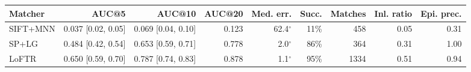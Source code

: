 \begin{tabular}{lrrrrrrrr}
\toprule
Matcher & AUC@5 & AUC@10 & AUC@20 & Med. err. & Succ. & Matches & Inl. ratio & Epi. prec. \\
\midrule
SIFT+MNN & 0.037 [0.02, 0.05] & 0.069 [0.04, 0.10] & 0.123 & 62.4$^\circ$ & 11\% & 458 & 0.05 & 0.31 \\
SP+LG & 0.484 [0.42, 0.54] & 0.653 [0.59, 0.71] & 0.778 & 2.0$^\circ$ & 86\% & 364 & 0.31 & 1.00 \\
LoFTR & 0.650 [0.59, 0.70] & 0.787 [0.74, 0.83] & 0.878 & 1.1$^\circ$ & 95\% & 1334 & 0.51 & 0.94 \\
\bottomrule
\end{tabular}
